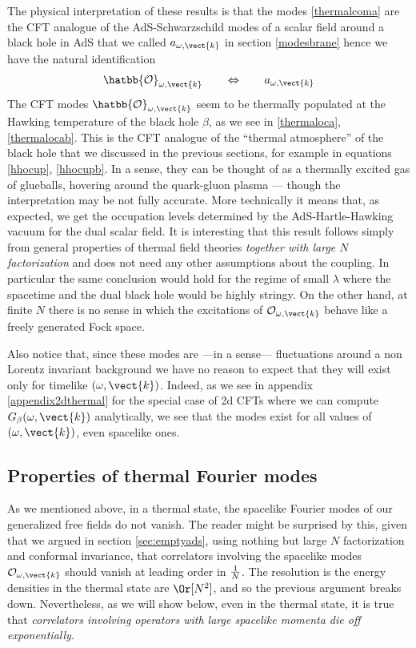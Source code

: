 The physical interpretation of these results is that the modes \eqref{thermalcoma} are the CFT analogue of the AdS-Schwarzschild modes of a scalar field around a black hole in AdS that we called $a_{\omega,\vect{k}}$ in section \ref{modesbrane} hence we have the natural identification
\vskip5pt
\[
 \hatbb{\cal O}_{\omega,\vect{k}}\qquad\Leftrightarrow \qquad a_{\omega,\vect{k}}
\]
\vskip5pt
The CFT modes $\hatbb{\cal O}_{\omega,\vect{k}}$ seem to be thermally populated at the Hawking temperature of the black hole $\beta$, as we see in \eqref{thermaloca},\eqref{thermalocab}. This is the CFT analogue of the ``thermal atmosphere'' of the black hole that we discussed in the previous sections, for example in equations \eqref{hhocup}, \eqref{hhocupb}. In a sense, they can be thought of as a thermally excited gas of glueballs, hovering around the quark-gluon plasma --- though the interpretation
may be not fully accurate. More technically it means that, as expected, we get the occupation levels determined by the AdS-Hartle-Hawking vacuum for the dual scalar field. It is interesting that this result follows simply from general properties of thermal field theories {\it together with large $N$ factorization} and does not need any other assumptions about the coupling. In particular the same conclusion would hold for the regime of small $\lambda$ where 
the spacetime and the dual black hole would be highly stringy. On the other hand, at finite $N$ there is no sense in which the excitations of ${\cal O}_{\omega,\vect{k}}$ behave like a freely generated Fock space.


Also notice that, since these modes are ---in a sense--- fluctuations around a non Lorentz invariant background we have no reason to expect that they will exist only for timelike $(\omega,\vect{k})$. Indeed, as we see in appendix \ref{appendix2dthermal} for the special case of 2d CFTs where we can compute $G_\beta(\omega,\vect{k})$ analytically, we see that the modes exist for all values of $(\omega,\vect{k})$, even spacelike ones.

\subsection{Properties of thermal Fourier modes}
\label{subsec:thermalfourier}

As we mentioned above, in a thermal state, the spacelike Fourier modes of our generalized free fields do not vanish. The reader might be surprised by this, given that we argued in section \ref{sec:emptyads}, using nothing but large $N$ factorization and conformal invariance, that correlators involving the spacelike modes ${\cal O}_{\omega,\vect{k}}$ should vanish at leading order in ${1 \over N}$.  The resolution is the energy densities in the thermal state are $\Or[N^2]$, and so the previous argument breaks down. Nevertheless, as we will show below, even in the thermal state, it is true that 
{\em correlators involving operators with  large spacelike momenta die off exponentially.}

